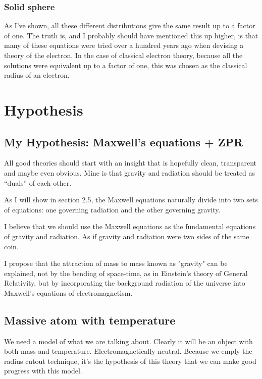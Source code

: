 \documentclass {article}
\begin{document}
\subsubsection{Solid sphere}

As I’ve shown, all these different distributions give the same result up to a factor of one. The truth is, and I probably should have mentioned this up higher, is that many of these equations were tried over a hundred years ago when devising a theory of the electron. In the case of classical electron theory, because all the solutions were equivalent up to a factor of one, this was chosen as the classical radius of an electron. 

\section{Hypothesis}

		
\subsection{My Hypothesis: Maxwell's equations  + ZPR}

All good theories should start with an insight that is hopefully clean, transparent and maybe even obvious. Mine is that gravity and radiation should be treated as “duals” of each other.

As I will show in section 2.5, the Maxwell equations naturally divide into two sets of equations: one governing radiation and the other governing gravity. 

I believe that we should use the Maxwell equations as the fundamental equations of gravity and radiation. As if gravity and radiation were two sides of the same coin. 

I propose that the attraction of mass to mass known as "gravity" can be explained, not by the bending of space-time, as in Einstein's theory of General Relativity, but by incorporating the background radiation of the universe into Maxwell's equations of electromagnetism.

\subsection{Massive atom with temperature}
We need a model of what we are talking about. Clearly it will be an object with both mass and temperature. Electromagnetically neutral. Because we emply the radius cutout technique, it's the hypothesis of this theory that we can make good progress with this model.
\end{document}
